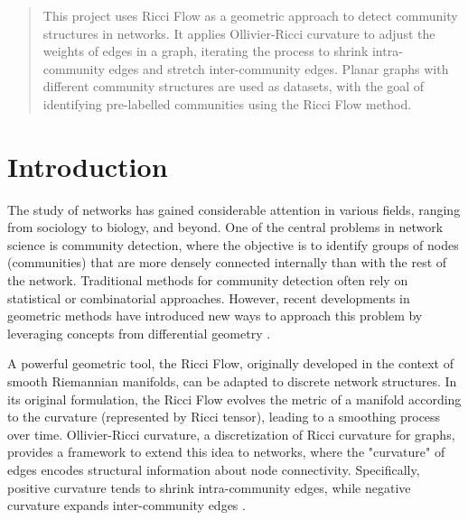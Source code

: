 \documentclass[12pt,a4paper]{article}
\begin{document}



\begin{abstract}
    \noindent This project uses Ricci Flow as a geometric approach to detect community structures in networks. It applies Ollivier-Ricci curvature to adjust the weights of edges in a graph, iterating the process to shrink intra-community edges and stretch inter-community edges. Planar graphs with different community structures are used as datasets, with the goal of identifying pre-labelled communities using the Ricci Flow method. 

\end{abstract}

\vspace{2cm}

\tableofcontents
{}
\thispagestyle{empty}

\newpage 
\setcounter{secnumdepth}{-1}

\mainmatter

\setcounter{secnumdepth}{2}
\pagestyle{fancy}
\renewcommand{\sectionmark}[1]{\markboth{#1}{#1}}
\fancyhead[R]{}
\fancyhead[L]{\thesection \MakeUppercase{\textit{\ --\ \leftmark}}}

\section{Introduction}
The study of networks has gained considerable attention in various fields, ranging from sociology to biology, and beyond. One of the central problems in network science is community detection, where the objective is to identify groups of nodes (communities) that are more densely connected internally than with the rest of the network. Traditional methods for community detection often rely on statistical or combinatorial approaches. However, recent developments in geometric methods have introduced new ways to approach this problem by leveraging concepts from differential geometry \cite{communitydetectionnetworksricci}.

A powerful geometric tool, the Ricci Flow, originally developed in the context of smooth Riemannian manifolds, can be adapted to discrete network structures. In its original formulation, the Ricci Flow evolves the metric of a manifold according to the curvature (represented by Ricci tensor), leading to a smoothing process over time. Ollivier-Ricci curvature, a discretization of Ricci curvature for graphs, provides a framework to extend this idea to networks, where the "curvature" of edges encodes structural information about node connectivity. Specifically, positive curvature tends to shrink intra-community edges, while negative curvature expands inter-community edges \cite{communitydetectionnetworksricci}.
\end{document}
